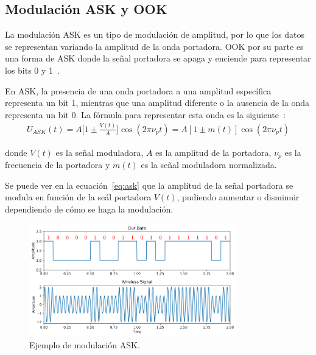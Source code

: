\documentclass[12pt, letterpaper]{article}
\begin{document}
\subsection{Modulación ASK y OOK}
La modulación ASK es un tipo de modulación de amplitud, por lo que los datos se representan variando la amplitud de la onda portadora. OOK por su parte es una forma de ASK donde la señal portadora se apaga y enciende para representar los bits 0 y 1~\cite{ask-unidad3}.

En ASK, la presencia de una onda portadora a una amplitud específica representa un bit 1, mientras que una amplitud diferente o la ausencia de la onda representa un bit 0. La fórmula para representar esta onda es la siguiente~\cite{modulacion-uv}:
\begin{align}
    U_{ASK}(t) = A \Big[1 \pm \frac{V(t)}{A} \Big] \cos(2\pi \nu_p t) = 
    A [1 \pm m(t)] \cos(2\pi \nu_p t) \label{eq:ask}
\end{align}

donde $V(t)$ es la señal moduladora, $A$ es la amplitud de la portadora, $\nu_p$ es la frecuencia de la portadora y $m(t)$ es la señal moduladora normalizada.

Se puede ver en la ecuación~\ref{eq:ask} que la amplitud de la señal portadora se modula en función de la seál portadora $V(t)$, pudiendo aumentar o disminuir dependiendo de cómo se haga la modulación.

\begin{figure}[h]
    \centering
    \includegraphics[width=9cm]{images/ASK.png}
    \caption{Ejemplo de modulación ASK.}\label{fig:ask}
\end{figure}
\end{document}
